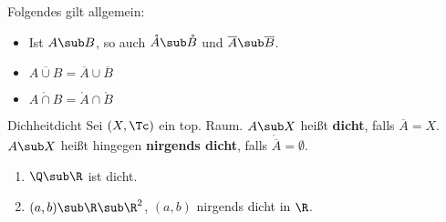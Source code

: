 \begin{bemerkung}
Folgendes gilt allgemein:
\begin{itemize}
\item Ist $A \sub B$, so auch $\mathring{A} \sub \mathring{B}$ und $\overline{A} \sub \overline{B}$.
\item $\overline{A \cup B} = \overline{A} \cup \overline{B}$
\item $\mathring{A \cap B} = \mathring{A} \cap \mathring{B}$
\end{itemize}
\end{bemerkung}
\begin{definition}{Dichheit}{dicht}
Sei $(X, \Tc)$ ein top. Raum. $A \sub X$ heißt \textbf{dicht}, falls $\overline{A} = X$. $A\sub X$ heißt hingegen \textbf{nirgends dicht}, falls $\mathring{\overline{A}}= \emptyset$.
\end{definition}
\begin{beispiele}
\begin{enumerate}
\item $\Q \sub \R$ ist dicht.
\item $(a,b) \sub \R \sub \R^2$, $(a,b)$ nirgends dicht in $\R$.
\end{enumerate}
\end{beispiele}